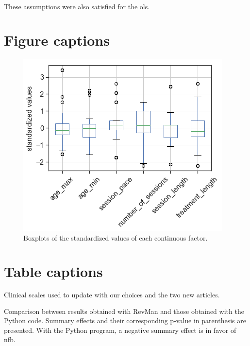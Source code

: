 \documentclass[12pt,a4paper,english]{article}
\begin{document}
These assumptions were also satisfied for the \gls{ols}.

\clearpage



\clearpage

\section*{Figure captions}

\begin{figure}[h!]
	\center
  \includegraphics[scale=1]{figures/factors_analysis_boxplot_no_colors_no_two_columns.png}
  \caption{Boxplots of the standardized values of each continuous factor.}
  \label{Figure:factors_analysis_boxplots}
\end{figure}

\section*{Table captions}

\begin{table}[h!]
  \centering
  \caption{Clinical scales used to update \citet{Cortese2016} with our choices and the two new articles.}

  \label{Table:Table_mr_clinical_scales_update_cortese}
\end{table}

\begin{table}[h!]
  \centering
  \caption{Comparison between \citet{Cortese2016} results obtained with RevMan \citep{RevMan} and those obtained with the Python code. Summary 
	effects and their corresponding p-value in parenthesis are presented. With the Python program, a negative summary effect is in favor of \gls{nfb}.}

  \label{Table:meta_review_comparison_between_revman_python}
\end{table}
\end{document}
